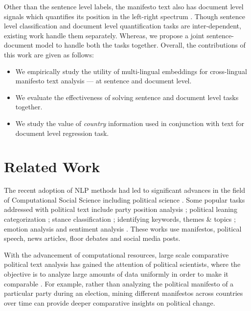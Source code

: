 \documentclass[11pt,a4paper]{article}
\begin{document}

Other than the sentence level labels, the manifesto text also has document level signals 
which quantifies its position in the left-right spectrum \cite{slapin2008scaling}. Though sentence level classification and document level quantification tasks are inter-dependent, existing work handle them separately.  Whereas, we propose a joint sentence-document model to handle both the tasks together. Overall, the contributions of this work are given as follows:
\begin{itemize}
\item We empirically study the utility of multi-lingual embeddings for cross-lingual manifesto text analysis --- at sentence and document level.

\item We evaluate the effectiveness of solving sentence and document level tasks together.

\item We study the value of \textit{country} information used in conjunction with text for document level regression task.
\end{itemize}


\section{Related Work}

The recent adoption of NLP methods had led to significant advances in the field of Computational Social Science \cite{lazer2009life} including political science \cite{grimmer2013text}. Some popular tasks addressed with political text include party position analysis \cite{biessmann2016automating};  political leaning categorization \cite{akoglu2014quantifying, zhou2011classifying}; stance classification \cite{sridhar2014collective}; identifying keywords, themes \& topics \cite{karan2016analysis, nallapati2004extraction, ding2011keyphrase}; emotion analysis \cite{rheault2016expressions} and sentiment analysis \cite{bakliwal2013sentiment}. These works use manifestos, political speech, news articles, floor debates and social media posts. 

With the advancement of computational resources, large scale comparative political text analysis has gained the attention of political scientists, where the objective is to analyze large amounts of data uniformly in order to make it comparable \cite{lucas2015computer}. For example, rather than analyzing the political manifesto of a particular party during an election, mining different manifestos across countries over time can provide deeper comparative insights on political change.
\end{document}
